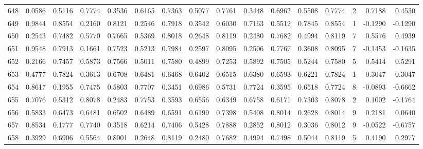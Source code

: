\begin{tabular}{lrrrrrrrrrrrrrrr}
648 &      0.0586 &  0.5116 &  0.7774 &  0.3536 &  0.6165 &  0.7363 &  0.5077 &  0.7761 &  0.3448 &  0.6962 &   0.5508 &     0.7774 &      2 &                    0.7188 &                     0.4530 \\
649 &      0.9844 &  0.8554 &  0.2160 &  0.8121 &  0.2546 &  0.7918 &  0.3542 &  0.6030 &  0.7163 &  0.5512 &   0.7845 &     0.8554 &      1 &                   -0.1290 &                    -0.1290 \\
650 &      0.2543 &  0.7482 &  0.5770 &  0.7665 &  0.5369 &  0.8018 &  0.2648 &  0.8119 &  0.2480 &  0.7682 &   0.4994 &     0.8119 &      7 &                    0.5576 &                     0.4939 \\
651 &      0.9548 &  0.7913 &  0.1661 &  0.7523 &  0.5213 &  0.7984 &  0.2597 &  0.8095 &  0.2506 &  0.7767 &   0.3608 &     0.8095 &      7 &                   -0.1453 &                    -0.1635 \\
652 &      0.2166 &  0.7457 &  0.5873 &  0.7566 &  0.5011 &  0.7580 &  0.4899 &  0.7253 &  0.5892 &  0.7505 &   0.5244 &     0.7580 &      5 &                    0.5414 &                     0.5291 \\
653 &      0.4777 &  0.7824 &  0.3613 &  0.6708 &  0.6481 &  0.6468 &  0.6402 &  0.6515 &  0.6380 &  0.6593 &   0.6221 &     0.7824 &      1 &                    0.3047 &                     0.3047 \\
654 &      0.8617 &  0.1955 &  0.7475 &  0.5803 &  0.7707 &  0.3451 &  0.6986 &  0.5731 &  0.7724 &  0.3595 &   0.6518 &     0.7724 &      8 &                   -0.0893 &                    -0.6662 \\
655 &      0.7076 &  0.5312 &  0.8078 &  0.2483 &  0.7753 &  0.3593 &  0.6556 &  0.6349 &  0.6758 &  0.6171 &   0.7303 &     0.8078 &      2 &                    0.1002 &                    -0.1764 \\
656 &      0.5833 &  0.6473 &  0.6481 &  0.6502 &  0.6489 &  0.6591 &  0.6199 &  0.7398 &  0.5408 &  0.8014 &   0.2628 &     0.8014 &      9 &                    0.2181 &                     0.0640 \\
657 &      0.8534 &  0.1777 &  0.7740 &  0.3518 &  0.6214 &  0.7406 &  0.5428 &  0.7888 &  0.2852 &  0.8012 &   0.3036 &     0.8012 &      9 &                   -0.0522 &                    -0.6757 \\
658 &      0.3929 &  0.6906 &  0.5564 &  0.8001 &  0.2648 &  0.8119 &  0.2480 &  0.7682 &  0.4994 &  0.7498 &   0.5044 &     0.8119 &      5 &                    0.4190 &                     0.2977 \\

\end{tabular}
